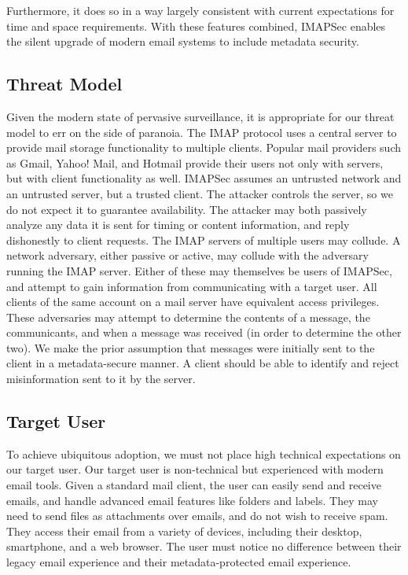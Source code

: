 \documentclass[pageno]{jpaper}
\newcommand{\project}{IMAPSec }
\newcommand{\projectnospace}{IMAPSec}
\begin{document}
Furthermore, it does so in a way largely consistent with current expectations for time and space requirements. With these features combined, \project enables the silent upgrade of modern email systems to include metadata security.



\subsection{Threat Model}

Given the modern state of pervasive surveillance, it is appropriate for our threat model to err on the side of paranoia. The IMAP protocol uses a central server to provide mail storage functionality to multiple clients. Popular mail providers such as Gmail, Yahoo! Mail, and Hotmail provide their users not only with servers, but with client functionality as well. \project assumes an untrusted network and an untrusted server, but a trusted client. The attacker controls the server, so we do not expect it to guarantee availability. The attacker may both passively analyze any data it is sent for timing or content information, and reply dishonestly to client requests. The IMAP servers of multiple users may collude. A network adversary, either passive or active, may collude with the adversary running the IMAP server. Either of these may themselves be users of \projectnospace, and attempt to gain information from communicating with a target user. All clients of the same account on a mail server have equivalent access privileges. These adversaries may attempt to determine the contents of a message, the communicants, and when a message was received (in order to determine the other two). We make the prior assumption that messages were initially sent to the client in a metadata-secure manner. A client should be able to identify and reject misinformation sent to it by the server.


\subsection{Target User}
\label{targetuser}

To achieve ubiquitous adoption, we must not place high technical expectations on our target user. Our target user is non-technical but experienced with modern email tools. Given a standard mail client, the user can easily send and receive emails, and handle advanced email features like folders and labels. They may need to send files as attachments over emails, and do not wish to receive spam. They access their email from a variety of devices, including their desktop, smartphone, and a web browser. The user must notice no difference between their legacy email experience and their metadata-protected email experience.
\end{document}
